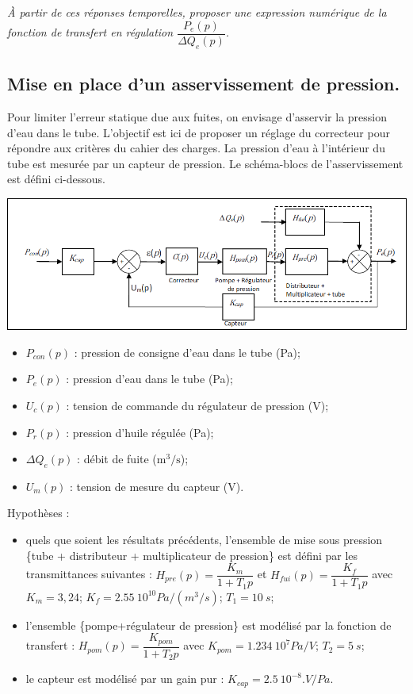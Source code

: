 \documentclass[10pt,fleqn]{article} %
\begin{document}
\subparagraph{}
\textit{À partir de ces réponses temporelles, proposer une expression numérique de la fonction de transfert en régulation $\dfrac{P_e(p)}{\Delta Q_e(p)}$.}

\subsection{Mise en place d'un asservissement de pression.}
Pour limiter l’erreur statique due aux fuites, on envisage d’asservir la pression d’eau dans le tube. L’objectif est ici de proposer un réglage du correcteur pour répondre aux critères du cahier des charges.
La pression d’eau à l’intérieur du tube est mesurée par un capteur de pression. Le schéma-blocs de l’asservissement est défini ci-dessous.

\begin{center}
\includegraphics[width=\linewidth]{images_02/fig_06}
\end{center}

\begin{itemize}
\item $P_{con}(p)$ 	: 	pression de consigne d’eau dans le tube (Pa);
\item $P_e(p)$ 	:	pression d’eau dans le tube (Pa);
\item $U_c(p)$ 	: 	tension de commande du régulateur de pression (V);
\item $P_r(p)$ 	:	pression d’huile régulée (Pa);
\item $\Delta Q_e(p)$ 	:	débit de fuite ($\text{m}^3/\text{s}$);
\item $U_m(p)$ 	:	tension de mesure du capteur (V).
\end{itemize}

Hypothèses : 
\begin{itemize}
\item quels que soient les résultats précédents, l’ensemble de mise sous pression \{tube + distributeur + multiplicateur de pression\} est défini par les transmittances suivantes :
$H_{pre} (p)=\dfrac{K_m}{1+T_1 p}$ et $H_{fui} (p)=\dfrac{K_f}{1+T_1 p}$
avec $K_m = 3,24$; $K_f = \SI{2,55}{10^{10} Pa/(m^3/s)}$; $T_1  =\SI{10}{s}$; 
\item l’ensemble \{pompe+régulateur de pression\} est modélisé par la fonction de transfert :
$H_{pom} (p)=\dfrac{K_{pom}}{1+T_2 p}$ avec $K_{pom} = \SI{1,234}{10^7 Pa/V}$; 	$T_2 = \SI{5}{s}$;
\item le capteur est modélisé par un gain pur :	$K_{cap}= \SI{2,5}{10^{-8}.V/Pa}$.
\end{itemize}
\end{document}
